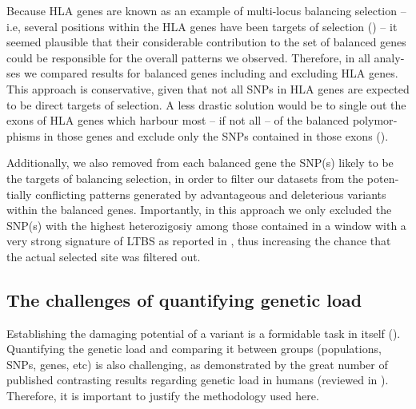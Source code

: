 \begin{refsection}
\begin{otherlanguage}{english}
Because HLA genes are known as an example of multi-locus balancing selection -- i.e, several positions within the HLA genes have been targets of selection (\cite{Hughes1988,Yang2002a,Bitarello2015}) -- it seemed plausible that their considerable contribution to the set of balanced genes could be responsible for the overall patterns we observed. Therefore, in all analyses we compared results for balanced genes including and excluding HLA genes. This approach is  conservative, given that not all SNPs in HLA genes are expected to be direct targets of selection. A less drastic solution would be to single out the exons of HLA genes which harbour most -- if not all -- of the balanced polymorphisms in those genes and exclude only the SNPs contained in those exons (\cite{Klein1986}). 

Additionally, we also  removed from each balanced gene the SNP(s) likely to be the targets of balancing selection, in order to filter our datasets from the potentially conflicting patterns generated by advantageous and deleterious variants within the balanced genes. Importantly, in this approach we only excluded the SNP(s) with the highest heterozigosiy among those contained in a window with a very strong signature of LTBS as reported in \textcite{Bitarello2016}, thus increasing the chance that the actual selected site was filtered out.

\subsection{The challenges of quantifying genetic load} 

Establishing the damaging potential of a variant is a formidable task in itself (\cite{Grimm2015}). Quantifying the genetic load and comparing it between groups (populations, SNPs, genes, etc) is also challenging, as demonstrated by the great number of published contrasting results regarding genetic load in humans (reviewed in \cite{Henn2015a}). Therefore, it is important to justify the methodology used here. 


\end{otherlanguage}
\end{refsection}
